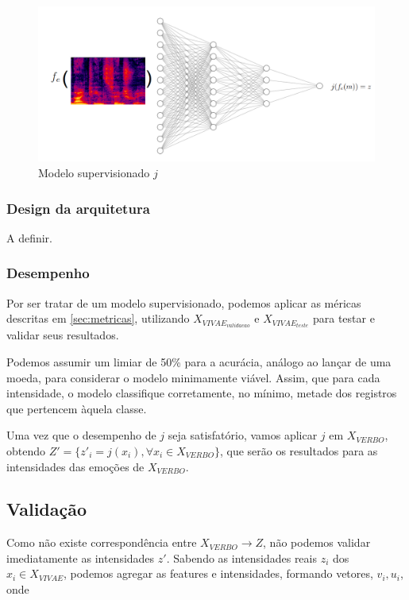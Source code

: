 \begin{figure}[!h]
\centering
\includegraphics[width=1.0\textwidth]{imagens/p-supervisionado.png}
\caption{\label{fig:jsupervisionado}Modelo supervisionado $j$}
\end{figure}

\subsubsection{Design da arquitetura}

A definir.

\subsubsection{Desempenho}

Por ser tratar de um modelo supervisionado, podemos aplicar as méricas descritas em \ref{sec:metricas}, utilizando $X_{VIVAE_{validacao}}$ e $X_{VIVAE_{teste}}$ para testar e validar seus resultados.

Podemos assumir um limiar de 50\% para a acurácia, análogo ao lançar de uma moeda, para considerar o modelo minimamente viável. Assim, que para cada intensidade, o modelo classifique corretamente, no mínimo, metade dos registros que pertencem àquela classe.

Uma vez que o desempenho de $j$ seja satisfatório, vamos aplicar $j$ em $X_{VERBO}$, obtendo $Z' = \{z'{_i} = j(x_i), \forall x_i \in X_{VERBO}\}$, que serão os resultados para as intensidades das emoções de $X_{VERBO}$.


\subsection{Validação}

Como não existe correspondência entre $X_{VERBO} \rightarrow Z$, não podemos validar imediatamente as intensidades $z'$. Sabendo as intensidades reais $z_i$ dos $x_i \in X_{VIVAE}$, podemos agregar as features e intensidades, formando vetores, $v_i, u_i$, onde

